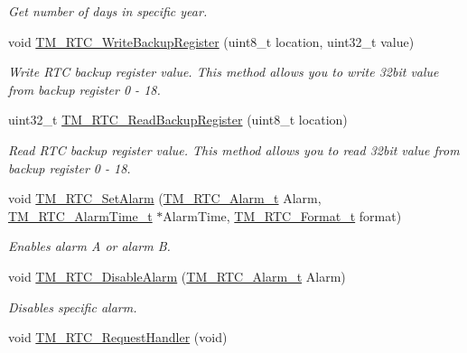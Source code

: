 \begin{DoxyCompactItemize}
\begin{DoxyCompactList}\small\item\em Get number of days in specific year. \end{DoxyCompactList}\item 
void \hyperlink{group___t_m___r_t_c___functions_ga0e64097447132cfaca8e9f966eb5b364}{T\+M\+\_\+\+R\+T\+C\+\_\+\+Write\+Backup\+Register} (uint8\+\_\+t location, uint32\+\_\+t value)
\begin{DoxyCompactList}\small\item\em Write R\+T\+C backup register value. This method allows you to write 32bit value from backup register 0 -\/ 18. \end{DoxyCompactList}\item 
uint32\+\_\+t \hyperlink{group___t_m___r_t_c___functions_ga36b9c6ac83cb17f06710ce83d1d2f407}{T\+M\+\_\+\+R\+T\+C\+\_\+\+Read\+Backup\+Register} (uint8\+\_\+t location)
\begin{DoxyCompactList}\small\item\em Read R\+T\+C backup register value. This method allows you to read 32bit value from backup register 0 -\/ 18. \end{DoxyCompactList}\item 
void \hyperlink{group___t_m___r_t_c___functions_gaee6b82bb5861cb4427cc4296dfa1c0ee}{T\+M\+\_\+\+R\+T\+C\+\_\+\+Set\+Alarm} (\hyperlink{group___t_m___r_t_c___typedefs_ga3c4d1d5831bf262f1994e8cc45007e7b}{T\+M\+\_\+\+R\+T\+C\+\_\+\+Alarm\+\_\+t} Alarm, \hyperlink{struct_t_m___r_t_c___alarm_time__t}{T\+M\+\_\+\+R\+T\+C\+\_\+\+Alarm\+Time\+\_\+t} $\ast$Alarm\+Time, \hyperlink{group___t_m___r_t_c___typedefs_ga4ef7bf7d2c67f2dc6208ecb5926b0354}{T\+M\+\_\+\+R\+T\+C\+\_\+\+Format\+\_\+t} format)
\begin{DoxyCompactList}\small\item\em Enables alarm A or alarm B. \end{DoxyCompactList}\item 
void \hyperlink{group___t_m___r_t_c___functions_ga46f745b32e15b1d3df2619114d1da9af}{T\+M\+\_\+\+R\+T\+C\+\_\+\+Disable\+Alarm} (\hyperlink{group___t_m___r_t_c___typedefs_ga3c4d1d5831bf262f1994e8cc45007e7b}{T\+M\+\_\+\+R\+T\+C\+\_\+\+Alarm\+\_\+t} Alarm)
\begin{DoxyCompactList}\small\item\em Disables specific alarm. \end{DoxyCompactList}\item 
void \hyperlink{group___t_m___r_t_c___functions_gac7dd8cc4cabfeaea791b6004ebecc33b}{T\+M\+\_\+\+R\+T\+C\+\_\+\+Request\+Handler} (void)

\end{DoxyCompactItemize}
